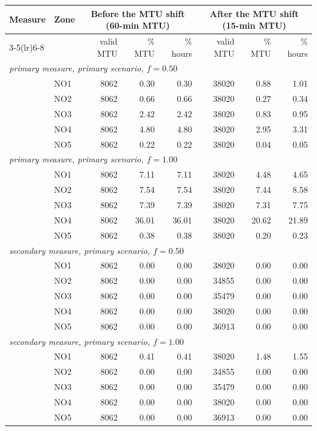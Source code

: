 \begin{tabular}{llrrrrrr}
\toprule
Measure & Zone & \multicolumn{3}{c}{Before the MTU shift (60-min MTU)} & \multicolumn{3}{c}{After the MTU shift (15-min MTU)} \\
\cmidrule(lr){3-5}\cmidrule(lr){6-8}
 & & valid MTU & \% MTU & \% hours & valid MTU & \% MTU & \% hours \\
\midrule
\multicolumn{8}{l}{\emph{primary measure, primary scenario, $f = 0.50$}} \\
 & NO1 & 8062 & 0.30 & 0.30 & 38020 & 0.88 & 1.01 \\
 & NO2 & 8062 & 0.66 & 0.66 & 38020 & 0.27 & 0.34 \\
 & NO3 & 8062 & 2.42 & 2.42 & 38020 & 0.83 & 0.95 \\
 & NO4 & 8062 & 4.80 & 4.80 & 38020 & 2.95 & 3.31 \\
 & NO5 & 8062 & 0.22 & 0.22 & 38020 & 0.04 & 0.05 \\
\multicolumn{8}{l}{\emph{primary measure, primary scenario, $f = 1.00$}} \\
 & NO1 & 8062 & 7.11 & 7.11 & 38020 & 4.48 & 4.65 \\
 & NO2 & 8062 & 7.54 & 7.54 & 38020 & 7.44 & 8.58 \\
 & NO3 & 8062 & 7.39 & 7.39 & 38020 & 7.31 & 7.75 \\
 & NO4 & 8062 & 36.01 & 36.01 & 38020 & 20.62 & 21.89 \\
 & NO5 & 8062 & 0.38 & 0.38 & 38020 & 0.20 & 0.23 \\
\multicolumn{8}{l}{\emph{secondary measure, primary scenario, $f = 0.50$}} \\
 & NO1 & 8062 & 0.00 & 0.00 & 38020 & 0.00 & 0.00 \\
 & NO2 & 8062 & 0.00 & 0.00 & 34855 & 0.00 & 0.00 \\
 & NO3 & 8062 & 0.00 & 0.00 & 35479 & 0.00 & 0.00 \\
 & NO4 & 8062 & 0.00 & 0.00 & 38020 & 0.00 & 0.00 \\
 & NO5 & 8062 & 0.00 & 0.00 & 36913 & 0.00 & 0.00 \\
\multicolumn{8}{l}{\emph{secondary measure, primary scenario, $f = 1.00$}} \\
 & NO1 & 8062 & 0.41 & 0.41 & 38020 & 1.48 & 1.55 \\
 & NO2 & 8062 & 0.00 & 0.00 & 34855 & 0.00 & 0.00 \\
 & NO3 & 8062 & 0.00 & 0.00 & 35479 & 0.00 & 0.00 \\
 & NO4 & 8062 & 0.00 & 0.00 & 38020 & 0.00 & 0.00 \\
 & NO5 & 8062 & 0.00 & 0.00 & 36913 & 0.00 & 0.00 \\
\bottomrule
\end{tabular}
